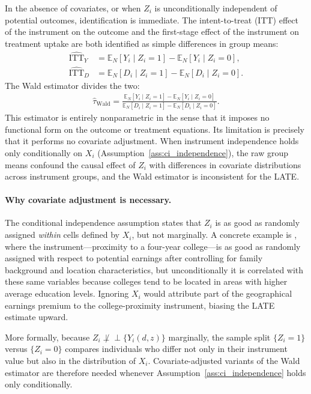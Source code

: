 \documentclass[12pt,a4paper]{article}
\newcommand{\En}{\mathbb{E}_N}
\begin{document}
In the absence of covariates, or when $Z_i$ is unconditionally independent of potential
outcomes, identification is immediate. The intent-to-treat (ITT) effect of the instrument on
the outcome and the first-stage effect of the instrument on treatment uptake are both
identified as simple differences in group means:
\begin{align}
    \widehat{\mathrm{ITT}}_Y
    &= \En[Y_i \mid Z_i = 1] - \En[Y_i \mid Z_i = 0], \\[4pt]
    \widehat{\mathrm{ITT}}_D
    &= \En[D_i \mid Z_i = 1] - \En[D_i \mid Z_i = 0].
\end{align}
The Wald estimator \citep{wald1940fitting} divides the two:
\begin{align}
    \hat{\tau}_{\mathrm{Wald}}
    =
    \frac{\En[Y_i \mid Z_i = 1] - \En[Y_i \mid Z_i = 0]}
         {\En[D_i \mid Z_i = 1] - \En[D_i \mid Z_i = 0]}.
    \label{eq:wald_estimator}
\end{align}
This estimator is entirely nonparametric in the sense that it imposes no functional form on
the outcome or treatment equations. Its limitation is precisely that it performs no
covariate adjustment. When instrument independence holds only conditionally on $X_i$
(Assumption~\ref{ass:ci_independence}), the raw group means confound the causal effect of
$Z_i$ with differences in covariate distributions across instrument groups, and the Wald
estimator is inconsistent for the LATE.

\paragraph{Why covariate adjustment is necessary.}

The conditional independence assumption states that $Z_i$ is as good as randomly assigned
\emph{within} cells defined by $X_i$, but not marginally. A concrete example is
\citet{card1993using}, where the instrument---proximity to a four-year college---is as good as randomly assigned with respect to potential earnings after controlling for family background and
location characteristics, but unconditionally it is correlated with these same variables
because colleges tend to be located in areas with higher average education levels. Ignoring
$X_i$ would attribute part of the geographical earnings premium to the college-proximity
instrument, biasing the LATE estimate upward.

More formally, because $Z_i \not\perp\!\!\!\perp \{Y_i(d,z)\}$ marginally, the sample split
$\{Z_i = 1\}$ versus $\{Z_i = 0\}$ compares individuals who differ not only in their
instrument value but also in the distribution of $X_i$. Covariate-adjusted variants of the
Wald estimator are therefore needed whenever Assumption~\ref{ass:ci_independence} holds
only conditionally.
\end{document}

